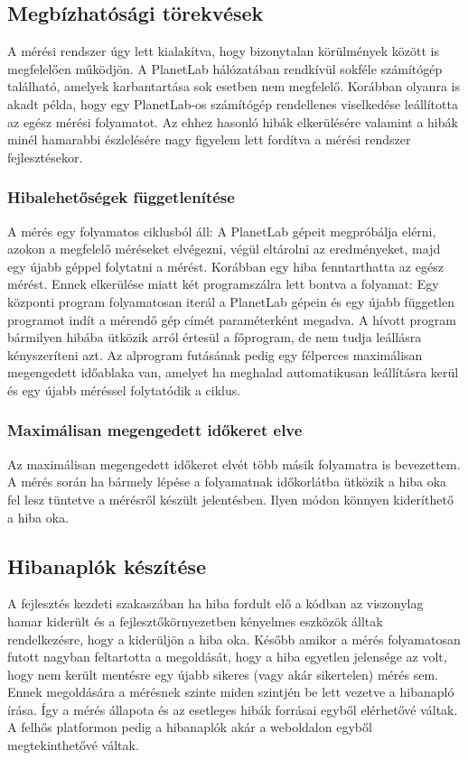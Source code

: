 \subsection{Megbízhatósági törekvések}
A mérési rendszer úgy lett kialakítva, hogy bizonytalan körülmények között is megfelelően működjön. A PlanetLab hálózatában rendkívül sokféle számítógép található, amelyek karbantartása sok esetben nem megfelelő. Korábban olyanra is akadt példa, hogy egy PlanetLab-os számítógép rendellenes viselkedése leállította az egész mérési folyamatot. Az ehhez hasonló hibák elkerülésére valamint a hibák minél hamarabbi észlelésére nagy figyelem lett fordítva a mérési rendszer fejlesztésekor.

\subsubsection*{Hibalehetőségek függetlenítése}
A mérés egy folyamatos ciklusból áll: A PlanetLab gépeit megpróbálja elérni, azokon a megfelelő méréseket elvégezni, végül eltárolni az eredményeket, majd egy újabb géppel folytatni a mérést.
Korábban egy hiba fenntarthatta az egész mérést. Ennek elkerülése miatt két programszálra lett bontva a folyamat: Egy központi program folyamatosan iterál a PlanetLab gépein és egy újabb független programot indít a mérendő gép címét paraméterként megadva. A hívott program bármilyen hibába ütközik arról értesül a főprogram, de nem tudja leállásra kényszeríteni azt. Az alprogram futásának pedig egy félperces maximálisan megengedett időablaka van, amelyet ha meghalad automatikusan leállításra kerül és egy újabb méréssel folytatódik a ciklus.

\subsubsection*{Maximálisan megengedett időkeret elve}
Az maximálisan megengedett időkeret elvét több másik folyamatra is bevezettem. A mérés során ha bármely lépése a folyamatnak időkorlátba ütközik a hiba oka fel lesz tüntetve a mérésről készült jelentésben. Ilyen módon könnyen kideríthető a hiba oka.

\subsection*{Hibanaplók készítése}
A fejlesztés kezdeti szakaszában ha hiba fordult elő a kódban az viszonylag hamar kiderült és a fejlesztőkörnyezetben kényelmes eszközök álltak rendelkezésre, hogy a kiderüljön a hiba oka. Később amikor a mérés folyamatosan futott nagyban feltartotta a megoldását, hogy a hiba egyetlen jelensége az volt, hogy nem került mentésre egy újabb sikeres (vagy akár sikertelen) mérés sem. Ennek megoldására a mérésnek szinte miden szintjén be lett vezetve a hibanapló írása. Így a mérés állapota és az esetleges hibák forrásai egyből elérhetővé váltak. A felhős platformon pedig a hibanaplók akár a weboldalon egyből megtekinthetővé váltak.

